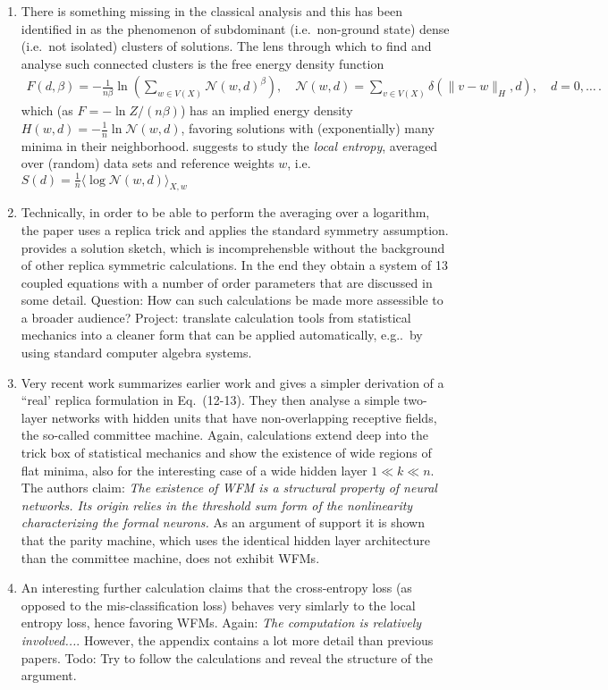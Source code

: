 \documentclass[10pt,a4paper]{article}
\begin{document}
\begin{enumerate}
\item 
There is something missing in the classical analysis and this has been identified in \cite{baldassi2015subdominant} as the phenomenon of subdominant (i.e.~non-ground state) dense (i.e.~not isolated) clusters of solutions. The lens through which to find and analyse such connected clusters is the free energy density function 
\begin{align}
F(d,\beta) = -\frac{1}{n\beta} \ln \left( \sum_{w \in V(X)}  \mathcal N(w,d)^\beta \right), \quad 
\mathcal N(w,d) = \sum_{v \in V(X)} \delta(\|v-w\|_H, d), \quad d=0,\dots \,.
\end{align}
which (as $F = - \ln Z /(n\beta)$) has an implied energy density $H(w,d) = -\tfrac 1n\ln \mathcal N(w,d)$, favoring solutions with (exponentially) many minima in their neighborhood. \cite{baldassi2015subdominant} suggests to study the \textit{local  entropy}, averaged over (random) data sets and reference weights $w$, i.e.~$S(d) = \frac 1n \langle \log \mathcal N(w,d) \rangle_{X,w}$
\item Technically, in order to be able to perform the averaging over a logarithm, the paper uses a replica trick and applies the standard symmetry assumption. \cite[Supplementary B]{baldassi2015subdominant} provides a solution sketch, which is incomprehensble without the background of other replica symmetric calculations. In the end they obtain a system of 13 coupled equations with a number of order parameters that are discussed in some detail. Question: How can such calculations be made more assessible to a broader audience? Project: translate calculation tools from statistical mechanics into a cleaner form that can be applied automatically, e.g..~by using standard computer algebra systems.   
\item Very recent work \cite{baldassi2019shaping} summarizes earlier work and gives a simpler derivation of a ``real'   replica formulation in Eq.~(12-13). They then analyse a simple two-layer networks with hidden units that have non-overlapping receptive fields, the so-called committee machine. Again, calculations extend deep into the trick box of statistical mechanics and show the existence of wide regions of flat minima, also for the interesting case of a wide hidden layer $1 \ll k \ll n$.  The authors claim: \textit{The existence of WFM is a structural property of neural networks. Its origin relies in the threshold sum form of the nonlinearity characterizing the formal neurons.} As an argument of support it is shown that the parity machine, which uses the identical hidden layer architecture than the committee machine, does not exhibit WFMs.
\item An interesting further calculation claims that the cross-entropy loss (as opposed to the mis-classification loss) behaves very simlarly to the local entropy loss, hence favoring WFMs. Again: \textit{The computation is relatively involved...}. However, the appendix contains a lot more detail than previous papers. Todo: Try to follow the calculations and reveal the structure of the argument. 
\end{enumerate} 



\end{document}
